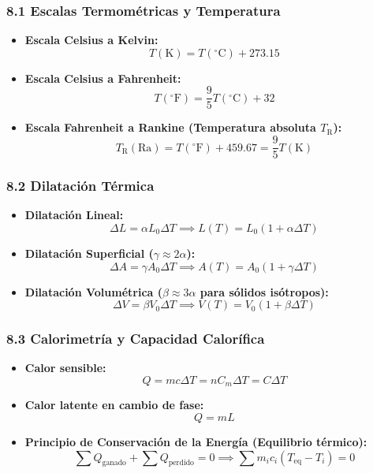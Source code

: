 \documentclass[11pt,a4paper]{article}
\begin{document}
\subsubsection*{8.1 Escalas Termométricas y Temperatura}

\begin{itemize}
  \item \textbf{Escala Celsius a Kelvin:}
  \[
    T(\text{K}) = T(^\circ\text{C}) + 273.15
  \]
  \item \textbf{Escala Celsius a Fahrenheit:}
  \[
    T(^\circ\text{F}) = \frac{9}{5} T(^\circ\text{C}) + 32
  \]
  \item \textbf{Escala Fahrenheit a Rankine (Temperatura absoluta $T_{\text{R}}$):}
  \[
    T_{\text{R}}(\text{Ra}) = T(^\circ\text{F}) + 459.67 = \frac{9}{5} T(\text{K})
  \]
\end{itemize}

\subsubsection*{8.2 Dilatación Térmica}

\begin{itemize}
  \item \textbf{Dilatación Lineal:}
  \[
    \Delta L = \alpha L_0 \Delta T \implies L(T) = L_0 (1 + \alpha \Delta T)
  \]
  \item \textbf{Dilatación Superficial ($\gamma \approx 2\alpha$):}
  \[
    \Delta A = \gamma A_0 \Delta T \implies A(T) = A_0 (1 + \gamma \Delta T)
  \]
  \item \textbf{Dilatación Volumétrica ($\beta \approx 3\alpha$ para sólidos isótropos):}
  \[
    \Delta V = \beta V_0 \Delta T \implies V(T) = V_0 (1 + \beta \Delta T)
  \]
\end{itemize}

\subsubsection*{8.3 Calorimetría y Capacidad Calorífica}

\begin{itemize}
  \item \textbf{Calor sensible:}
  \[
    Q = m c \Delta T = n C_m \Delta T = C \Delta T
  \]
  \item \textbf{Calor latente en cambio de fase:}
  \[
    Q = m L
  \]
  \item \textbf{Principio de Conservación de la Energía (Equilibrio térmico):}
  \[
    \sum Q_{\text{ganado}} + \sum Q_{\text{perdido}} = 0 \implies \sum m_i c_i (T_{\text{eq}} - T_i) = 0
  \]
\end{itemize}
\end{document}
